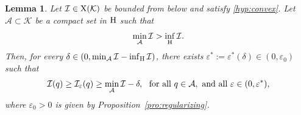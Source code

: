 \documentclass{article}
\newcommand{\boK}{\mathcal{K}}
\newcommand{\boI}{\mathcal{I}}
\newcommand{\boA}{\mathcal{A}}
\newcommand{\Hilb}{{\textnormal H}}
\newcommand{\X}{{\textnormal X}}
\newtheorem{lemma}{Lemma}[section]
\theoremstyle{definition}
\begin{document}
\begin{lemma}\label{lemma:bound-regularized}
Let $\boI\in\X(\boK)$ be bounded from below and satisfy \eqref{hyp:convex}. Let $\boA\subset\boK$ be a compact set in $\Hilb$ such that
\begin{equation}
\min_\boA\boI>\inf_\Hilb\boI.
\end{equation}
Then, for every $\delta\in(0,\min_{\boA}\boI-\inf_{\Hilb}\boI)$, there exists $\varepsilon^*:=\varepsilon^*(\delta)\in(0,\varepsilon_0)$ such that
\begin{equation}\label{eq:bounds_boA}
\boI(q)\geq\boI_\varepsilon(q)\geq\min_\boA\boI-\delta,\ \hbox{ for all }q\in\boA,\hbox{ and all }\varepsilon\in(0,\varepsilon^*),
\end{equation}
where $\varepsilon_0>0$ is given by Proposition~\ref{pro:regularizing}.
\end{lemma}
\end{document}
